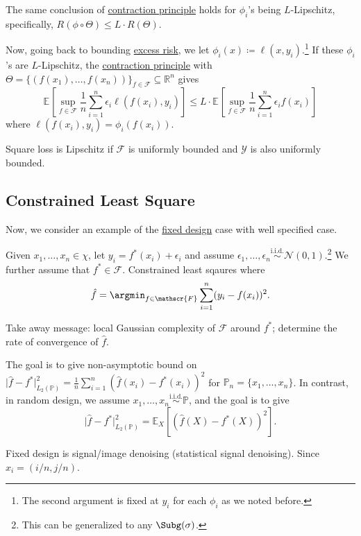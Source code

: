 \begin{corollary}\label{col:contraction-principle}
	The same conclusion of \hyperref[thm:contraction-principle]{contraction principle} holds for \(\phi _i\)'s being \(L\)-Lipschitz, specifically, \(R(\phi \circ \Theta ) \leq L\cdot R(\Theta )\).
\end{corollary}

Now, going back to bounding \hyperref[not:excess-risk]{excess risk}, we let \(\phi _i (x) \coloneqq \ell (x, y_i)\).\footnote{The second argument is fixed at \(y_i\) for each \(\phi _i\) as we noted before.} If these \(\phi _i\)'s are \(L\)-Lipschitz, the \hyperref[col:contraction-principle]{contraction principle} with \(\Theta = \{ (f(x_1), \dots , f(x_n)) \} _{f\in \mathscr{F} } \subseteq \mathbb{R} ^n \) gives
\[
	\mathbb{E}_{}\left[\sup _{f\in \mathscr{F} } \frac{1}{n} \sum_{i=1}^{n} \epsilon _i \ell (f(x_i), y_i) \right]
	\leq L\cdot \mathbb{E}_{}\left[\sup _{f\in \mathscr{F} } \frac{1}{n} \sum_{i=1}^{n} \epsilon _i f(x_i) \right]
\]
where \(\ell (f(x_i), y_i) = \phi _i(f(x_i))\).

\begin{eg}
	Square loss is Lipschitz if \(\mathscr{F} \) is uniformly bounded and \(\mathscr{Y} \) is also uniformly bounded.
\end{eg}

\subsection{Constrained Least Square}
Now, we consider an example of the \hyperref[prb:fixed-design-non-parametric-LS]{fixed design} case with well specified case.

\begin{problem}\label{prb:constrained-least-square}
Given \(x_1, \dots , x_n \in \chi \), let \(y_i = f^{\ast} (x_i) + \epsilon _i\) and assume \(\epsilon _1, \dots , \epsilon _n \overset{\text{i.i.d.} }{\sim } \mathcal{N} (0, 1) \).\footnote{This can be generalized to any \(\Subg(\sigma )\).} We further assume that \(f^{\ast} \in \mathscr{F} \). Constrained least sqaures where
\[
	\hat{f} = \argmin_{f\in\mathscr{F} } \sum_{i=1}^{n} (y_i - f(x_i))^2.
\]
\end{problem}

\begin{remark}
	Take away message: local Gaussian complexity of \(\mathscr{F} \) around \(f^{\ast} \); determine the rate of convergence of \(\hat{f} \).
\end{remark}

The goal is to give non-asymptotic bound on \(\vert \hat{f} - f^{\ast} \vert ^2 _{L_2(\mathbb{P} )} = \frac{1}{n} \sum_{i=1}^{n} (\hat{f} (x_i) - f^{\ast} (x_i))^2\) for \(\mathbb{P} _n = \{ x_1, \dots , x_n \} \). In contrast, in random design, we assume \(x_1, \dots , x_n \overset{\text{i.i.d.} }{\sim } \mathbb{P} \), and the goal is to give
\[
	\vert \hat{f} - f^{\ast} \vert ^2_{L_2(\mathbb{P} )} = \mathbb{E}_{X}\left[(\hat{f} (X) - f^{\ast} (X))^2 \right] .
\]

\begin{intuition}
	Fixed design is signal/image denoising (statistical signal denoising). Since \(x_i = (i / n, j / n)\).
\end{intuition}